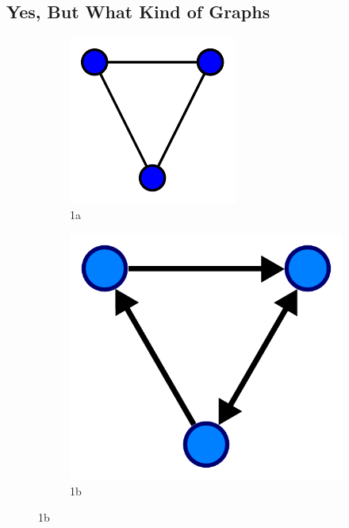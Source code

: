 \documentclass{book}
\begin{document}
\subsection{Yes, But What Kind of Graphs}
\begin{figure}
    \begin{subfigure}{.5\textwidth}
        \centering
        \includegraphics[width=.8\linewidth]{assets/images/Undirected.svg.pdf}
        \caption{1a}
        \label{fig:sfig1}
    \end{subfigure}%
    \begin{subfigure}{.5\textwidth}
        \centering
        \includegraphics[width=.8\linewidth]{assets/images/Directed.svg.pdf}
        \caption{1b}

\end{subfigure}
\end{figure}
\end{document}
